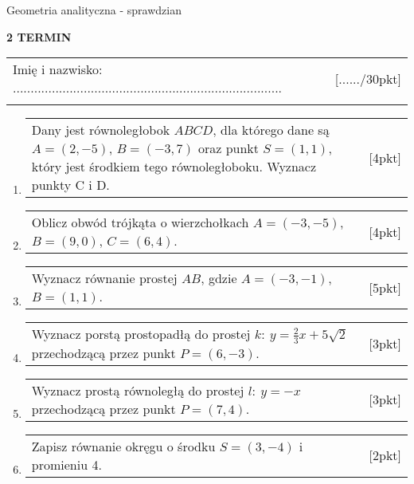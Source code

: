 \documentclass[12pt,a4paper]{article}
\begin{document}
	\begin{center}
		\LARGE Geometria analityczna - sprawdzian
	\end{center}
	\vspace{1.5cm}
	\begin{flushright}
		\textbf{2 TERMIN}
	\end{flushright}
	\begin{tabular}{p{13cm} r}
		Imię i nazwisko: ............................................................................
		&[....../30pkt]\\ 
		\vspace{0.5cm}
	\end{tabular}
	\begin{enumerate}[1.]
		\item  \begin{tabular}{p{13cm} r}
			Dany jest równoległobok $ABCD$, dla którego dane są $A=(2,-5)$, $B=(-3,7)$ oraz punkt $S=(1,1)$, który jest środkiem tego równoległoboku. Wyznacz punkty C i D.  &[4pkt]\\ 
		\end{tabular}
		
		\item  \begin{tabular}{p{13cm} r}
			Oblicz obwód trójkąta o wierzchołkach $A=(-3,-5)$,$B=(9,0)$, $C=(6,4)$.
			&[4pkt]\\ 
		\end{tabular}
		
		\item \begin{tabular}{p{13cm} r}
			Wyznacz równanie prostej $AB$, gdzie $A=(-3,-1)$, $B=(1,1)$.
			&[5pkt]\\
		\end{tabular}
		
		\item \begin{tabular}{p{13cm} r}
			Wyznacz porstą prostopadłą do prostej $k:\:y=\frac{2}{3}x+5\sqrt{2}$ przechodzącą przez punkt $P=(6,-3)$.&[3pkt]\\
		\end{tabular}
	
	\item \begin{tabular}{p{13cm} r}
		Wyznacz prostą równoległą do prostej $l:\:y=-x$ przechodzącą przez punkt $P=(7,4)$.&[3pkt]\\
	\end{tabular}
		
		\item \begin{tabular}{p{13cm} r}
			Zapisz równanie okręgu o środku $S=(3,-4)$ i promieniu 4.&[2pkt]\\ 
		\end{tabular}
		\vspace{0.5cm}
		

\end{enumerate}
\end{document}
